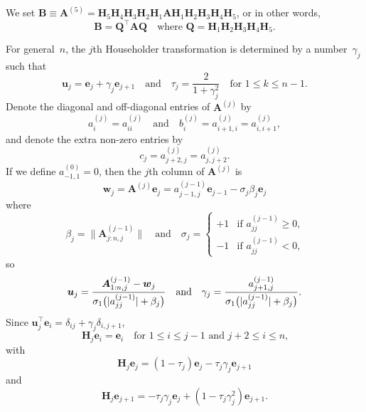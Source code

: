 \documentclass[12pt,a4paper]{article}
\newcommand{\bs}[1]{\boldsymbol{#1}}
\begin{document}
We set
$\bs{B}\equiv\bs{A}^{(5)}=\bs{H}_5\bs{H}_4\bs{H}_3\bs{H}_2\bs{H}_1\bs{A}
\bs{H}_1\bs{H}_2\bs{H}_3\bs{H}_4\bs{H}_5$, or in other words,
\[
\bs{B}=\bs{Q}^\top\bs{A}\bs{Q}
	\quad\text{where $\bs{Q}=\bs{H}_1\bs{H}_2\bs{H}_3\bs{H}_4\bs{H}_5$.}
\]

For general~$n$, the $j$th Householder transformation is determined by a
number~$\gamma_j$ such that
\[
\bs{u}_j=\bs{e}_j+\gamma_j\bs{e}_{j+1}
\quad\text{and}\quad
\tau_j=\frac{2}{1+\gamma_j^2}\quad\text{for $1\le k\le n-1$.}
\]
Denote the diagonal and off-diagonal entries of $\bs{A}^{(j)}$ by
\[
a^{(j)}_i=a^{(j)}_{ii}\quad\text{and}\quad
b^{(j)}_i=a^{(j)}_{i+1,i}=a^{(j)}_{i,i+1},
\]
and denote the extra non-zero entries by
\[
c_j=a^{(j)}_{j+2,j}=a^{(j)}_{j,j+2}.
\]
If we define $a^{(0)}_{-1,1}=0$, then the $j$th column of $\bs{A}^{(j)}$ is
\[
\bs{w}_j=\bs{A}^{(j)}\bs{e}_j=a^{(j-1)}_{j-1,j}\bs{e}_{j-1}
	-\sigma_j\beta_j\bs{e}_j
\]
where
\[
\beta_j=\|\bs{A}^{(j-1)}_{j:n,j}\|\quad\text{and}\quad
\sigma_j=\begin{cases}
+1&\text{if $a^{(j-1)}_{jj}\ge0$,}\\
-1&\text{if $a^{(j-1)}_{jj}<0$,}
\end{cases}
\]
so
\[
\bs{u}_j=\frac{\bs{A}^{(j-1)}_{1:n,j}-\bs{w}_j}{%
\sigma_1\bigl(|a^{(j-1)}_{jj}|+\beta_j\bigr)}
\quad\text{and}\quad
\gamma_j=\frac{a^{(j-1)}_{j+1,j}}{\sigma_1\bigl(|a^{(j-1)}_{jj}|+\beta_j\bigr)}.
\]
Since $\bs{u}_j^\top\bs{e}_i=\delta_{ij}+\gamma_j\delta_{i,j+1}$,
\[
\bs{H}_j\bs{e}_i=\bs{e}_i\quad\text{for $1\le i\le j-1$ and $j+2\le i\le n$,}
\]
with
\[
\bs{H}_j\bs{e}_j=(1-\tau_j)\bs{e}_j-\tau_j\gamma_j\bs{e}_{j+1}
\]
and
\[
\bs{H}_j\bs{e}_{j+1}=-\tau_j\gamma_j\bs{e}_j+(1-\tau_j\gamma_j^2)\bs{e}_{j+1}.
\]
\end{document}
